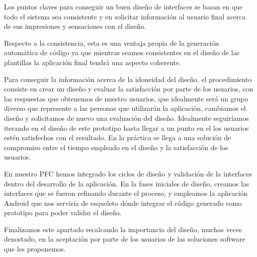 Los puntos claves para conseguir un buen diseño de interfaces se basan en que todo el sistema sea consistente y en solicitar información al usuario final acerca de sus impresiones y sensaciones con el diseño.\par 
Respecto a la consistencia, esta es una ventaja propia de la generación automática de código ya que mientras seamos consistentes en el diseño de las plantillas la aplicación final tendrá una aspecto coherente.\par
Para conseguir la información acerca de la idoneidad del diseño, el procedimiento consiste en crear un diseño y evaluar la satisfacción por parte de los usuarios, con las respuestas que obtenemos de nuestro usuarios, que idealmente será un grupo diverso que represente a las personas que utilizarán la aplicación, cambiamos el diseño y solicitamos de nuevo una evaluación del diseño. Idealmente seguiríamos iterando en el diseño de este prototipo hasta llegar a un punto en el los usuarios estén satisfechos con el resultado. En la práctica se llega a una solución de compromiso entre el tiempo empleado en el diseño y la satisfacción de los usuarios.\par
En nuestro PFC hemos integrado los ciclos de diseño y validación de la interfaces dentro del desarrollo de la aplicación. En la fases iniciales de diseño, creamos las interfaces que se fueron refinando durante el proceso, y empleamos la aplicación Android que nos serviría de esqueleto dónde integrar el código generado como prototipo para poder validar el diseño.\medskip \par
Finalizamos este apartado recalcando la importancia del diseño, muchas veces denostado, en la aceptación por parte de los usuarios de las soluciones software que les proponemos. 

